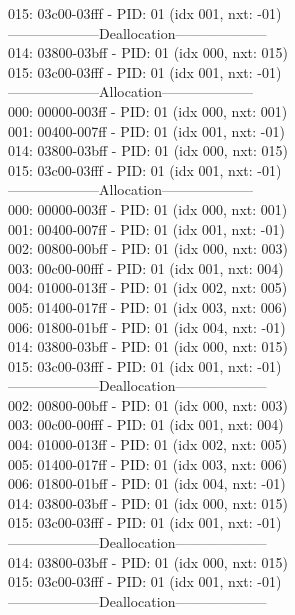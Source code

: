 \documentclass[10pt]{article}
\begin{document}
015: 03c00-03fff - PID: 01 (idx 001, nxt: -01)\\
--------------------Deallocation-------------------- \\
014: 03800-03bff - PID: 01 (idx 000, nxt: 015)\\
015: 03c00-03fff - PID: 01 (idx 001, nxt: -01)\\
--------------------Allocation-------------------- \\
000: 00000-003ff - PID: 01 (idx 000, nxt: 001)\\
001: 00400-007ff - PID: 01 (idx 001, nxt: -01)\\
014: 03800-03bff - PID: 01 (idx 000, nxt: 015)\\
015: 03c00-03fff - PID: 01 (idx 001, nxt: -01)\\
--------------------Allocation-------------------- \\
000: 00000-003ff - PID: 01 (idx 000, nxt: 001)\\
001: 00400-007ff - PID: 01 (idx 001, nxt: -01)\\
002: 00800-00bff - PID: 01 (idx 000, nxt: 003)\\
003: 00c00-00fff - PID: 01 (idx 001, nxt: 004)\\
004: 01000-013ff - PID: 01 (idx 002, nxt: 005)\\
005: 01400-017ff - PID: 01 (idx 003, nxt: 006)\\
006: 01800-01bff - PID: 01 (idx 004, nxt: -01)\\
014: 03800-03bff - PID: 01 (idx 000, nxt: 015)\\
015: 03c00-03fff - PID: 01 (idx 001, nxt: -01)\\
--------------------Deallocation-------------------- \\
002: 00800-00bff - PID: 01 (idx 000, nxt: 003)\\
003: 00c00-00fff - PID: 01 (idx 001, nxt: 004)\\
004: 01000-013ff - PID: 01 (idx 002, nxt: 005)\\
005: 01400-017ff - PID: 01 (idx 003, nxt: 006)\\
006: 01800-01bff - PID: 01 (idx 004, nxt: -01)\\
014: 03800-03bff - PID: 01 (idx 000, nxt: 015)\\
015: 03c00-03fff - PID: 01 (idx 001, nxt: -01)\\
--------------------Deallocation-------------------- \\
014: 03800-03bff - PID: 01 (idx 000, nxt: 015)\\
015: 03c00-03fff - PID: 01 (idx 001, nxt: -01)\\
--------------------Deallocation-------------------- \\
\end{document}
